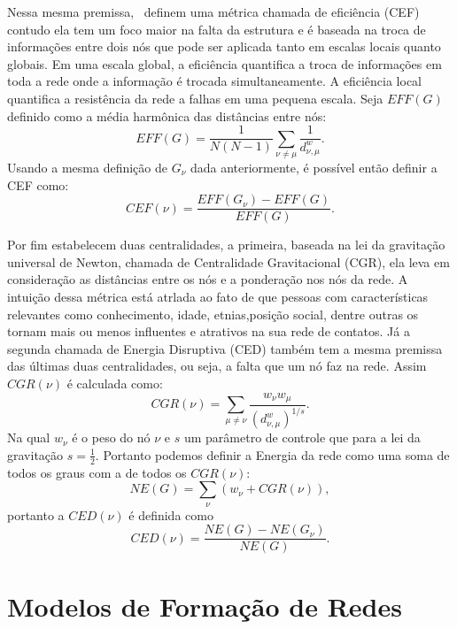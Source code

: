 Nessa mesma premissa,~ definem uma métrica chamada de eficiência (CEF) contudo ela tem um foco maior na falta da estrutura e é baseada na troca de informações entre dois nós que pode ser aplicada tanto em escalas locais quanto globais. Em uma escala global, a eficiência quantifica a troca de informações em toda a rede onde a informação é trocada simultaneamente. A eficiência local quantifica a resistência da rede a falhas em uma pequena escala. Seja $EFF(G)$ definido como a média harmônica das distâncias entre nós:
\begin{equation}
    EFF(G) = \frac{1}{N(N-1)}\sum_{\nu \neq \mu}\frac{1}{d^w_{\nu,\mu}}.
\end{equation}
Usando a mesma definição de $G_\nu$ dada anteriormente, é possível então definir a CEF como: 
\begin{equation}
    CEF(\nu) = \frac{EFF(G_\nu) - EFF(G)}{EFF(G)}.
\end{equation}

Por fim
\cite{deAndrade2021} estabelecem duas centralidades, a primeira, baseada na lei da gravitação universal de Newton, chamada de Centralidade Gravitacional (CGR), ela leva em consideração as distâncias entre os nós e a ponderação nos nós da rede. A intuição dessa métrica está atrlada ao fato de que pessoas com características relevantes como conhecimento, idade, etnias,posição social, dentre outras os tornam mais ou menos influentes e atrativos na sua rede de contatos. Já a segunda chamada de Energia Disruptiva (CED) também tem a mesma premissa das últimas duas centralidades, ou seja, a falta que um nó faz na rede. Assim $CGR(\nu)$ é calculada como:
\begin{equation}
    CGR(\nu) =\sum_{\mu \neq \nu}\frac{w_\nu w_\mu}{(d_{\nu,\mu}^w)^{1/s}}.
\end{equation}
Na qual $w_\nu$ é o peso do nó $\nu$ e $s$ um parâmetro de controle que para a lei da gravitação $s = \frac{1}{2}$. Portanto podemos definir a Energia da rede como uma 
soma de todos os graus com a de todos os $CGR(\nu)$:
\begin{equation}
    NE(G) = \sum\limits_{\nu}\left(w_\nu + CGR(\nu) \right),
\end{equation}
portanto a $CED(\nu)$ é definida como
\begin{equation}
    CED(\nu) = \frac{NE(G) - NE(G_\nu)}{NE(G)}.
\end{equation}

\section{Modelos de Formação de Redes}

